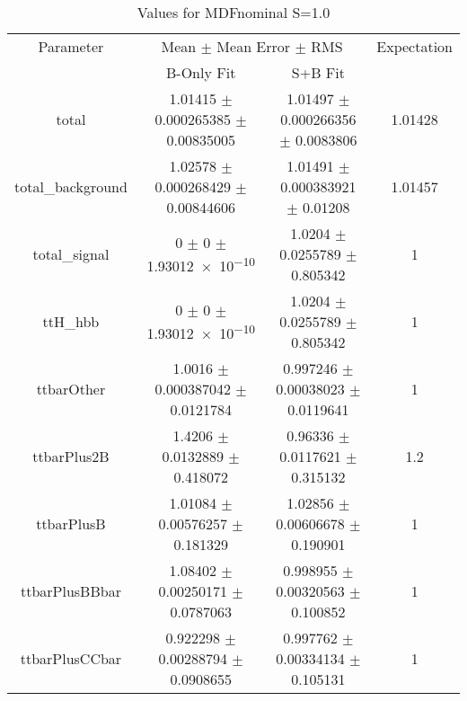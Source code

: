 \begin{table}
\centering
\caption{Values for MDFnominal S=1.0}
\begin{tabular}{cccc}
\toprule
Parameter & \multicolumn{2}{c}{Mean $\pm$ Mean Error $\pm$ RMS} & Expectation\\
 & B-Only Fit & S+B Fit & \\
\midrule
total & \num{1.01415} $\pm$ \num{0.000265385} $\pm$ \num{0.00835005} & \num{1.01497} $\pm$ \num{0.000266356} $\pm$ \num{0.0083806} & \num{1.01428}\\
total\_background & \num{1.02578} $\pm$ \num{0.000268429} $\pm$ \num{0.00844606} & \num{1.01491} $\pm$ \num{0.000383921} $\pm$ \num{0.01208} & \num{1.01457}\\
total\_signal & \num{0} $\pm$ \num{0} $\pm$ \num{1.93012e-10} & \num{1.0204} $\pm$ \num{0.0255789} $\pm$ \num{0.805342} & \num{1}\\
ttH\_hbb & \num{0} $\pm$ \num{0} $\pm$ \num{1.93012e-10} & \num{1.0204} $\pm$ \num{0.0255789} $\pm$ \num{0.805342} & \num{1}\\
ttbarOther & \num{1.0016} $\pm$ \num{0.000387042} $\pm$ \num{0.0121784} & \num{0.997246} $\pm$ \num{0.00038023} $\pm$ \num{0.0119641} & \num{1}\\
ttbarPlus2B & \num{1.4206} $\pm$ \num{0.0132889} $\pm$ \num{0.418072} & \num{0.96336} $\pm$ \num{0.0117621} $\pm$ \num{0.315132} & \num{1.2}\\
ttbarPlusB & \num{1.01084} $\pm$ \num{0.00576257} $\pm$ \num{0.181329} & \num{1.02856} $\pm$ \num{0.00606678} $\pm$ \num{0.190901} & \num{1}\\
ttbarPlusBBbar & \num{1.08402} $\pm$ \num{0.00250171} $\pm$ \num{0.0787063} & \num{0.998955} $\pm$ \num{0.00320563} $\pm$ \num{0.100852} & \num{1}\\
ttbarPlusCCbar & \num{0.922298} $\pm$ \num{0.00288794} $\pm$ \num{0.0908655} & \num{0.997762} $\pm$ \num{0.00334134} $\pm$ \num{0.105131} & \num{1}\\
\bottomrule
\end{tabular}
\end{table}